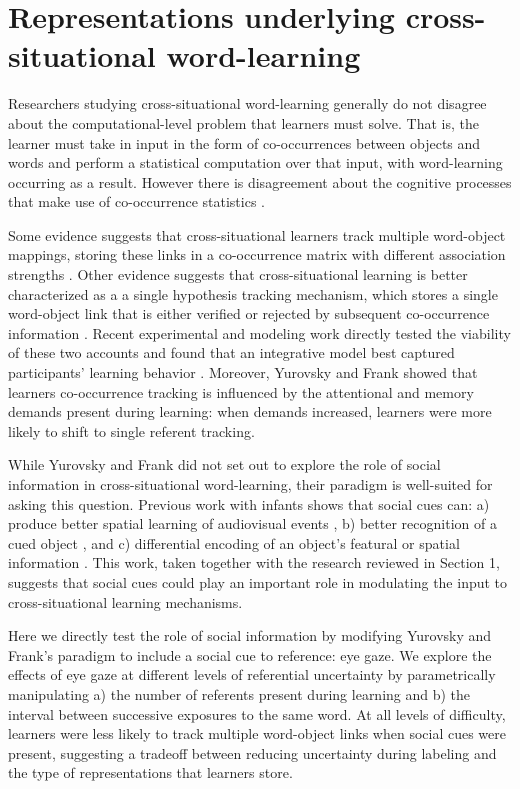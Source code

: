 \documentclass[man]{apa2}
\begin{document}

\section{Representations underlying cross-situational word-learning}

Researchers studying cross-situational word-learning generally do not disagree about the computational-level problem that learners must solve. That is, the learner must take in input in the form of co-occurrences between objects and words and perform a statistical computation over that input, with word-learning occurring as a result. However there is disagreement about the cognitive processes that make use of co-occurrence statistics \cite{smith2014unrealized}. 

Some evidence suggests that cross-situational learners track multiple word-object mappings, storing these links in a co-occurrence matrix with different association strengths \cite{vouloumanos2008fine, mcmurray2012word, yurovsky2014role}. Other evidence suggests that cross-situational learning is better characterized as a a single hypothesis tracking mechanism, which stores a single word-object link that is either verified or rejected by subsequent co-occurrence information \cite{trueswell2013propose,medina2011words}. Recent experimental and modeling work directly tested the viability of these two accounts and found that an integrative model best captured participants' learning behavior \cite{yurovsky2014algorithmic}. Moreover, Yurovsky and Frank showed that learners co-occurrence tracking is influenced by the attentional and memory demands present during learning: when demands increased, learners were more likely to shift to single referent tracking. 

While Yurovsky and Frank did not set out to explore the role of social information in cross-situational word-learning, their paradigm is well-suited for asking this question. Previous work with infants shows that social cues can: a) produce better spatial learning of audiovisual events \cite{wu2010no}, b) better recognition of a cued object \cite{cleveland2007joint}, and c) differential encoding of an object's featural or spatial information \cite{yoon2008communication}. This work, taken together with the research reviewed in Section 1, suggests that social cues could play an important role in modulating the input to cross-situational learning mechanisms.

Here we directly test the role of social information by modifying Yurovsky and Frank's paradigm to include a social cue to reference: eye gaze. We explore the effects of eye gaze at different levels of referential uncertainty by parametrically manipulating a) the number of referents present during learning and b) the interval between successive exposures to the same word. At all levels of difficulty, learners were less likely to track multiple word-object links when social cues were present, suggesting a tradeoff between reducing uncertainty during labeling and the type of representations that learners store.  
\end{document}
